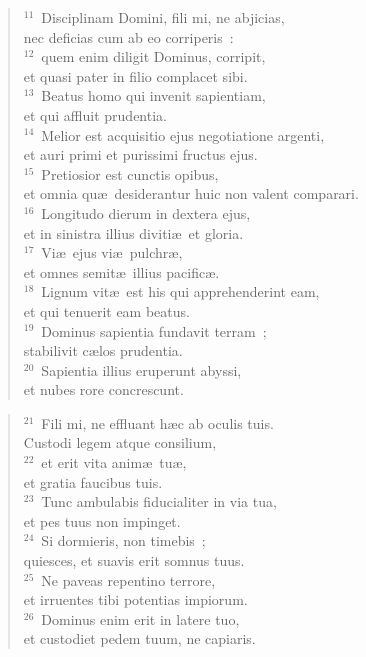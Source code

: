 \begin{flushleft}\begin{verse}${}^{11}$~Disciplinam Domini, fili mi, ne abjicias,\\ nec deficias cum ab eo corriperis~:\\
${}^{12}$~quem enim diligit Dominus, corripit,\\ et quasi pater in filio complacet sibi.\\
${}^{13}$~Beatus homo qui invenit sapientiam,\\ et qui affluit prudentia.\\
${}^{14}$~Melior est acquisitio ejus negotiatione argenti,\\ et auri primi et purissimi fructus ejus.\\
${}^{15}$~Pretiosior est cunctis opibus,\\ et omnia qu\ae\ desiderantur huic non valent comparari.\\
${}^{16}$~Longitudo dierum in dextera ejus,\\ et in sinistra illius diviti\ae\ et gloria.\\
${}^{17}$~Vi\ae\ ejus vi\ae\ pulchr\ae ,\\ et omnes semit\ae\ illius pacific\ae .\\
${}^{18}$~Lignum vit\ae\ est his qui apprehenderint eam,\\ et qui tenuerit eam beatus.\\
${}^{19}$~Dominus sapientia fundavit terram~;\\ stabilivit c\ae los prudentia.\\
${}^{20}$~Sapientia illius eruperunt abyssi,\\ et nubes rore concrescunt.\end{verse}\end{flushleft}


\begin{flushleft}\begin{verse}${}^{21}$~Fili mi, ne effluant h\ae c ab oculis tuis.\\ Custodi legem atque consilium,\\
${}^{22}$~et erit vita anim\ae\ tu\ae ,\\ et gratia faucibus tuis.\\
${}^{23}$~Tunc ambulabis fiducialiter in via tua,\\ et pes tuus non impinget.\\
${}^{24}$~Si dormieris, non timebis~;\\ quiesces, et suavis erit somnus tuus.\\
${}^{25}$~Ne paveas repentino terrore,\\ et irruentes tibi potentias impiorum.\\
${}^{26}$~Dominus enim erit in latere tuo,\\ et custodiet pedem tuum, ne capiaris.\end{verse}\end{flushleft}


